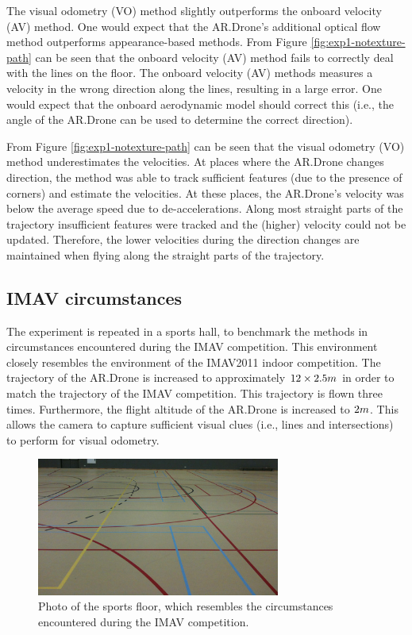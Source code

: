 The visual odometry (VO) method slightly outperforms the onboard velocity (AV) method.
One would expect that the AR.Drone's additional optical flow method outperforms appearance-based methods.
From Figure \ref{fig:exp1-notexture-path} can be seen that the onboard velocity (AV) method fails to correctly deal with the lines on the floor.
The onboard velocity (AV) methods measures a velocity in the wrong direction along the lines, resulting in a large error.
One would expect that the onboard aerodynamic model should correct this (i.e., the angle of the AR.Drone can be used to determine the correct direction).

From Figure \ref{fig:exp1-notexture-path} can be seen that the visual odometry (VO) method underestimates the velocities.
At places where the AR.Drone changes direction, the method was able to track sufficient features (due to the presence of corners) and estimate the velocities.
At these places, the AR.Drone's velocity was below the average speed due to de-accelerations.
Along most straight parts of the trajectory insufficient features were tracked and the (higher) velocity could not be updated.
Therefore, the lower velocities during the direction changes are maintained when flying along the straight parts of the trajectory.





\subsection{IMAV circumstances}
\label{sec:exp1-imav-circumstances}
The experiment is repeated in a sports hall, to benchmark the methods in circumstances encountered during the IMAV competition.
This environment closely resembles the environment of the IMAV2011 indoor competition.
The trajectory of the AR.Drone is increased to approximately $12 \times 2.5\small{m}$ in order to match the trajectory of the IMAV competition.
This  trajectory is flown three times.
Furthermore, the flight altitude of the AR.Drone is increased to $2\begin{small}m\end{small}$.
This allows the camera to capture sufficient visual clues (i.e., lines and intersections) to perform for visual odometry.

\begin{figure}[htb!]
\centering
\includegraphics[width=8cm]{images/exp1-imav-floor.jpg}
\caption{Photo of the sports floor, which resembles the circumstances encountered during the IMAV competition.}
\label{fig:exp1-floor}
\end{figure}

